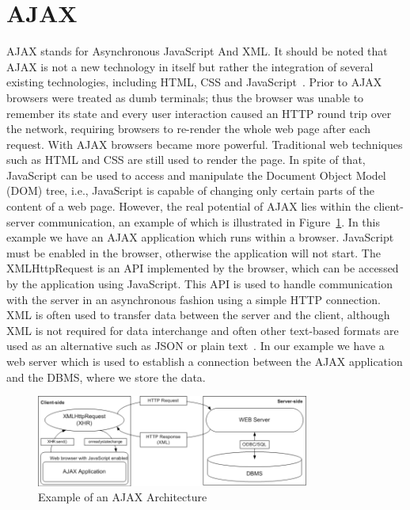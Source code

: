 \section{AJAX}
\label{sec:ajax}
AJAX stands for Asynchronous JavaScript And XML. It should be noted
that AJAX is not a new technology in itself but rather the integration of several 
existing technologies, including HTML, CSS and JavaScript~\cite{w3}. Prior to AJAX browsers 
were treated 
as dumb terminals; thus the browser was unable to remember its state and every 
user interaction caused an HTTP round trip over the network, requiring browsers 
to re-render the whole web page after each request. With AJAX browsers became 
more powerful. Traditional web techniques such as HTML and CSS are still used to 
render the page. In spite of that, JavaScript can be used to access 
and manipulate the Document Object Model (DOM) tree, i.e., 
JavaScript is capable of changing only certain parts
of the content of a web page. However, the
real potential of AJAX lies within the client-server communication, an example
of which is illustrated in Figure~\ref{fig:ajax01}. In this example we have an AJAX application
which runs within a browser. JavaScript must be enabled in the browser, otherwise
the application will not start.  
The XMLHttpRequest is an API implemented by the browser,
which can be accessed by the application using JavaScript. This API is 
used to handle communication with the server in an asynchronous fashion using a
simple HTTP connection. XML is often used to transfer data between the server and the client, 
although XML is not required for data interchange and often other text-based
formats are used as an alternative such as JSON or plain text~\cite{bajax1}. In our example we have 
a web server which is used to establish a connection between the AJAX application and
the DBMS, where we store the data.

\begin{figure}[h]
	\begin{center}
		\includegraphics[width=0.8\textwidth]{./img/ajax01a.png}
		\caption{Example of an AJAX Architecture}
		\label{fig:ajax01}
	\end{center}
\end{figure}

